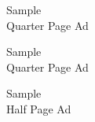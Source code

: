 \documentclass[12pt, a5paper, oneside]{article}
\begin{document}
\begin{minipage}[c][0.5\textheight]{0.5\linewidth}
\begin{framed}
\centering
    \Large Sample \\Quarter Page Ad
\end{framed}
\end{minipage}
\begin{minipage}[c][0.5\textheight]{0.5\linewidth}
\centering
    \Large Sample \\Quarter Page Ad
\end{minipage}
\begin{minipage}[c][0.25\textheight]{\linewidth}
\centering
    \Large Sample \\ Half Page Ad
\end{minipage}
\end{document}
